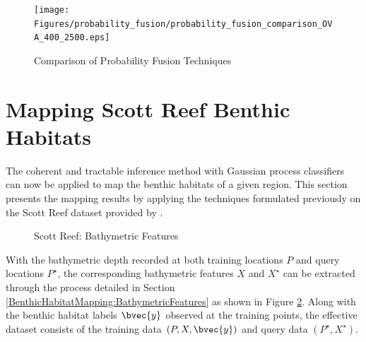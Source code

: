 				\begin{figure}[!htbp]
				\centering
					\texttt{[image: Figures/probability\_fusion/probability\_fusion\_comparison\_OVA\_400\_2500.eps]}
				\caption{Comparison of Probability Fusion Techniques}
				\label{Figure:ProbabilityFusion}
				\end{figure}
				
	\section{Mapping Scott Reef Benthic Habitats}
	\label{BenthicHabitatMapping:ScottReef}
		
		The coherent and tractable inference method with Gaussian process classifiers can now be applied to map the benthic habitats of a given region. This section presents the mapping results by applying the techniques formulated previously on the Scott Reef dataset provided by \cite{IMOS}.  
			
			\begin{figure}[!htbp]
			\centering
			\caption{Scott Reef: Bathymetric Features}
			\label{Figure:ScottReefBathymetricFeatures}
			\end{figure}
			
		With the bathymetric depth recorded at both training locations $P$ and query locations $P^{\star}$, the corresponding bathymetric features $X$ and $X^{\star}$ can be extracted through the process detailed in Section \ref{BenthicHabitatMapping:BathymetricFeatures} as shown in Figure \ref{Figure:ScottReefBathymetricFeatures}. Along with the benthic habitat labels $\bvec{y}$ observed at the training points, the effective dataset consists of the training data $(P, X, \bvec{y})$ and query data $(P^{\star}, X^{\star})$.

